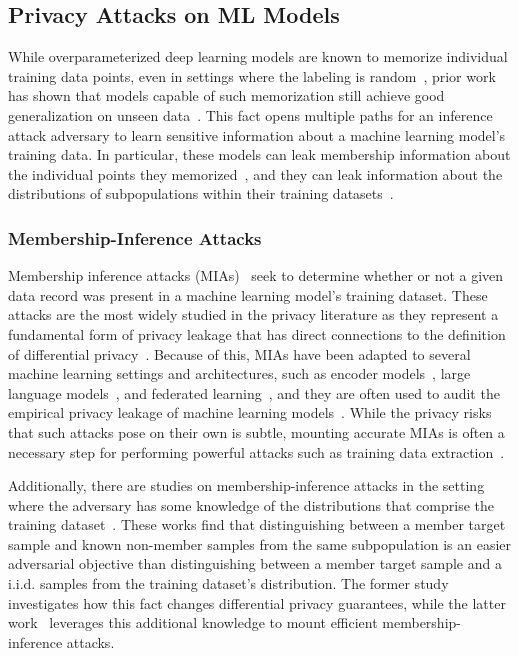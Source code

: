\subsection{Privacy Attacks on ML Models}

While overparameterized deep learning models are known to memorize individual training data points, even in settings where the labeling is random~\cite{zhang-2017-rethinking}, prior work has shown that models capable of such memorization still achieve good generalization on unseen data~\cite{belkin-2019-reconciling, feldman-2020-longtail, brown-2021-irrelevant}. This fact opens multiple paths for an inference attack adversary to learn sensitive information about a machine learning model's training data. In particular, these models can leak membership information about the individual points they memorized~\cite{shokri-2016-mi}, and they can leak information about the distributions of subpopulations within their training datasets~\cite{ateniese-2015-property_inference, kandpal2023userinference}.

\subsubsection{Membership-Inference Attacks}
Membership inference attacks (MIAs)~\cite{homer-2008-mi,SankararamanOJH09,dwork-2015-trace,shokri-2016-mi} seek to determine whether or not a given data record was present in a machine learning model's training dataset. These attacks are the most widely studied in the privacy literature as they represent a fundamental form of privacy leakage that has direct connections to the definition of differential privacy~\cite{dwork-2006-dmns}. Because of this, MIAs have been adapted to several machine learning settings and architectures, such as encoder models~\cite{liu2021encodermi, song-2020-embeddingleakage}, large language models~\cite{zhang2024mink, duan2024membershipinferenceattackswork}, and federated learning~\cite{suri2023subjectmembershipinferenceattacks, nasr-2019-federatedmia}, and they are often used to audit the empirical privacy leakage of machine learning models~\cite{song-2018-auditingmi, ye-2022-enhanced_mi, jagielski2020auditing}. While the privacy risks that such attacks pose on their own is subtle, mounting accurate MIAs is often a necessary step for performing powerful attacks such as training data extraction~\cite{carlini-2020-extraction_llm, carlini-2023-extraction_diffusion}. 

Additionally, there are studies on membership-inference attacks in the setting where the adversary has some knowledge of the distributions that comprise the training dataset~\cite{humphries-2023-dependencies, rezaei-2022-subpopulationbasedmia}. These works find that distinguishing between a member target sample and known non-member samples from the same subpopulation is an easier adversarial objective than distinguishing between a member target sample and a i.i.d. samples from the training dataset's distribution. The former study~\cite{humphries-2023-dependencies} investigates how this fact changes differential privacy guarantees, while the latter work~\cite{rezaei-2022-subpopulationbasedmia} leverages this additional knowledge to mount efficient membership-inference attacks.

